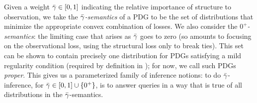 %
Given a weight ${\bar\gamma}
\in [0,1]
$
indicating the relative importance of structure to observation,
we take the \emph{${\bar\gamma}$-semantics} of a PDG to be the
set of distributions that minimize 
the appropriate convex combination of losses.
We also consider the \emph{$0^+$\!-semantics}: the limiting case that
arises as ${\bar\gamma}$ goes to zero
(so amounts to focusing on the observational loss, using the structural loss only to break ties).
This set
can be shown to contain precisely one distribution
for PDGs satisfying a mild regularity condition 
(required by definition in \citeauthor{pdg-aaai});
for now, we call such PDGs \emph{proper}.
This gives us a parameterized family of inference notions:
to do ${\bar\gamma}$-inference, for ${\bar\gamma} \in [0,1] \cup \{0^+\}$,
is to answer queries in a way that is true of all distributions in the ${\bar\gamma}$-semantics.

